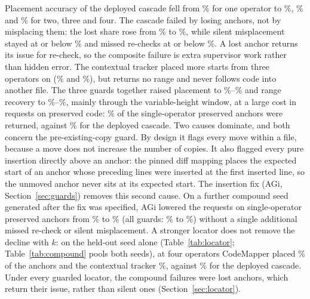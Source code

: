 Placement accuracy of the deployed cascade fell from \bTwoDepAccOne\% for one operator to \bTwoDepAccTwo\%, \bTwoDepAccThree\% and \bTwoDepAccFour\% for two, three and four. The cascade failed by losing anchors, not by misplacing them: the lost share rose from \bTwoDepLostOne\% to \bTwoDepLostFour\%, while silent misplacement stayed at or below \bTwoDepSilentTwo\% and missed re-checks at or below \bTwoDepMissOne\%. A lost anchor returns its issue for re-check, so the composite failure is extra supervisor work rather than hidden error. The contextual tracker placed more starts from three operators on (\bTwoTrkAccThree\% and \bTwoTrkAccFour\%), but returns no range and never follows code into another file. The three guards together raised placement to \bTwoAllAccOne\%--\bTwoAllAccFour\% and range recovery to \bTwoAllRangeOne\%--\bTwoAllRangeFour\%, mainly through the variable-height window, at a large cost in requests on preserved code: \bTwoAllFalseOne\% of the single-operator preserved anchors were returned, against \bTwoDepFalseOne\% for the deployed cascade. Two causes dominate, and both concern the pre-existing-copy guard. By design it flags every move within a file, because a move does not increase the number of copies. It also flagged every pure insertion directly above an anchor: the pinned diff mapping places the expected start of an anchor whose preceding lines were inserted at the first inserted line, so the unmoved anchor never sits at its expected start. The insertion fix (AGi, Section~\ref{sec:guards}) removes this second cause. On a further compound seed generated after the fix was specified, AGi lowered the requests on single-operator preserved anchors from \wiFrCmpOneCasAGFalse\% to \wiFrCmpOneCasAGiFalse\% (all guards: \wiFrCmpOneCasGFalse\% to \wiFrCmpOneCasGiFalse\%) without a single additional missed re-check or silent misplacement. A stronger locator does not remove the decline with $k$: on the held-out seed alone (Table~\ref{tab:locator}; Table~\ref{tab:compound} pools both seeds), at four operators CodeMapper placed \wiFrCmpFourCmQPlace\% of the anchors and the contextual tracker \wiFrCmpFourTrQPlace\%, against \wiFrCmpFourDepPlace\% for the deployed cascade. Under every guarded locator, the compound failures were lost anchors, which return their issue, rather than silent ones (Section~\ref{sec:locator}).

